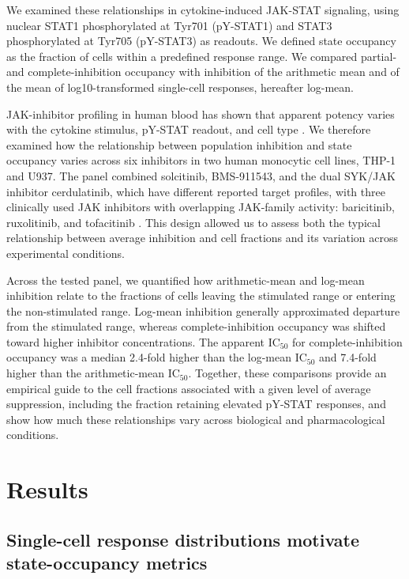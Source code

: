 \documentclass[11pt]{article}
\newcommand{\pstatone}{pY-STAT1}
\newcommand{\pstatthree}{pY-STAT3}
\newcommand{\icfifty}{IC$_{50}$}
\begin{document}
We examined these relationships in cytokine-induced JAK-STAT signaling, using nuclear STAT1 phosphorylated at Tyr701 (\pstatone{}) and STAT3 phosphorylated at Tyr705 (\pstatthree{}) as readouts. We defined state occupancy as the fraction of cells within a predefined response range. We compared partial- and complete-inhibition occupancy with inhibition of the arithmetic mean and of the mean of log10-transformed single-cell responses, hereafter log-mean.

JAK-inhibitor profiling in human blood has shown that apparent potency varies with the cytokine stimulus, pY-STAT readout, and cell type \citep{traves2021jak}. We therefore examined how the relationship between population inhibition and state occupancy varies across six inhibitors in two human monocytic cell lines, THP-1 and U937. The panel combined solcitinib, BMS-911543, and the dual SYK/JAK inhibitor cerdulatinib, which have different reported target profiles, with three clinically used JAK inhibitors with overlapping JAK-family activity: baricitinib, ruxolitinib, and tofacitinib \citep{haikarainen2026pharmacological,wan2015discovery,ma2015cerdulatinib}. This design allowed us to assess both the typical relationship between average inhibition and cell fractions and its variation across experimental conditions.


Across the tested panel, we quantified how arithmetic-mean and log-mean inhibition relate to the fractions of cells leaving the stimulated range or entering the non-stimulated range. Log-mean inhibition generally approximated departure from the stimulated range, whereas complete-inhibition occupancy was shifted toward higher inhibitor concentrations. The apparent \icfifty{} for complete-inhibition occupancy was a median 2.4-fold higher than the log-mean \icfifty{} and 7.4-fold higher than the arithmetic-mean \icfifty{}. Together, these comparisons provide an empirical guide to the cell fractions associated with a given level of average suppression, including the fraction retaining elevated pY-STAT responses, and show how much these relationships vary across biological and pharmacological conditions.

\section*{Results}

\subsection*{Single-cell response distributions motivate state-occupancy metrics}
\end{document}
